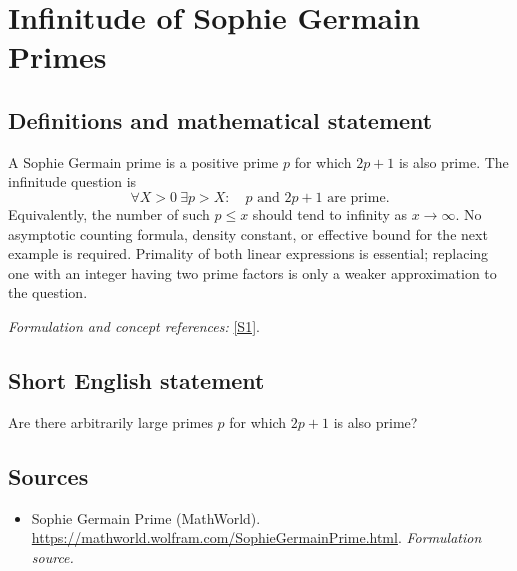 \documentclass[11pt]{article}
\begin{document}
\section*{\texorpdfstring{Infinitude of Sophie Germain Primes}{Infinitude of Sophie Germain Primes}}\label{390}
\subsection{Definitions and mathematical statement}
A Sophie Germain prime is a positive prime $p$ for which $2p+1$ is also prime. The infinitude question is
\[
 \forall X>0\ \exists p>X:\quad p\text{ and }2p+1\text{ are prime}.
\]
Equivalently, the number of such $p\le x$ should tend to infinity as $x\to\infty$. No asymptotic counting formula, density constant, or effective bound for the next example is required. Primality of both linear expressions is essential; replacing one with an integer having two prime factors is only a weaker approximation to the question.
\par\smallskip\textit{Formulation and concept references:} \href{https://mathworld.wolfram.com/SophieGermainPrime.html}{[S1]}.

\subsection{Short English statement}
Are there arbitrarily large primes $p$ for which $2p+1$ is also prime?
\subsection{Sources}
\begin{itemize}
\item[S1]Sophie Germain Prime (MathWorld).
\url{https://mathworld.wolfram.com/SophieGermainPrime.html}.
\textit{Formulation source.}
\end{itemize}
\end{document}

